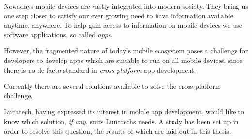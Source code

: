 \samenvatting



Nowadays mobile devices are vastly integrated into modern society. They bring us one step closer to satisfy our ever growing need to have information available anytime, anywhere. To help gain access to information on mobile devices we use software applications, so called \emph{apps}. 

However, the fragmented nature of today's mobile ecosystem poses a challenge for developers to develop apps which are suitable to run on all mobile devices, since there is no de facto standard in \emph{cross-platform} app development.

Currently there are several solutions available to solve the cross-platform challenge.

Lunatech, having expressed its interest in mobile app development, would like to know which solution, \emph{if any}, suits Lunatechs needs. A study has been set up in order to resolve this question, the results of which are laid out in this thesis.